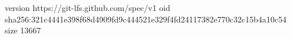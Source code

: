 version https://git-lfs.github.com/spec/v1
oid sha256:321c4441e398f68d4909fd9c444521e329f4fd24117382e770c32c15b4a10c54
size 13667
